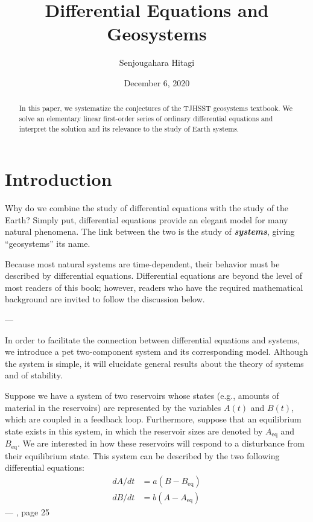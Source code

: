 \documentclass[11pt, oneside]{article}
\title{Differential Equations and Geosystems}
\author{Senjougahara Hitagi}
\date{December 6, 2020}
\newcommand{\emphasis}[1]{\textbf{\textit{#1}}}
\theoremstyle{plain}
\theoremstyle{definition}
\begin{document}
\maketitle

\begin{abstract}
  In this paper, we systematize the conjectures of the TJHSST geosystems
  textbook. We solve an elementary linear first-order series of ordinary
  differential equations and interpret the solution and its relevance to
  the study of Earth systems.
\end{abstract}

\section{Introduction}
Why do we combine the study of differential equations with the study of
the Earth? Simply put, differential equations provide an elegant model
for many natural phenomena. The link between the two is the study of
\emphasis{systems}, giving \enquote{geosystems} its name.
\begin{displayquote}
  Because most natural systems are time-dependent, their behavior must be
  described by differential equations. Differential equations are beyond the
  level of most readers of this book; however, readers who have the required
  mathematical background are invited to follow the discussion below.

  --- 
\end{displayquote}

In order to facilitate the connection between differential equations and
systems, we introduce a pet two-component system and its corresponding
model. Although the system is simple, it will elucidate general results
about the theory of systems and of stability.
\begin{displayquote}
  Suppose we have a system of two reservoirs whose states (e.g., amounts
  of material in the reservoirs) are represented by the variables
  \( A(t) \) and \( B(t) \), which are coupled in a feedback loop.
  Furthermore, suppose that an equilibrium state exists in
  this system, in which the reservoir sizes are denoted by
  \( A_\text{eq} \) and \( B_\text{eq} \).
  We are interested in how these reservoirs will respond to a
  disturbance from their equilibrium state. This system can
  be described by the two following differential equations:
  \begin{align*}
    dA/dt &= a(B - B_\text{eq}) \\
    dB/dt &= b(A - A_\text{eq})
  \end{align*}
  --- \cite{textbook}, page 25
\end{displayquote}
\end{document}
